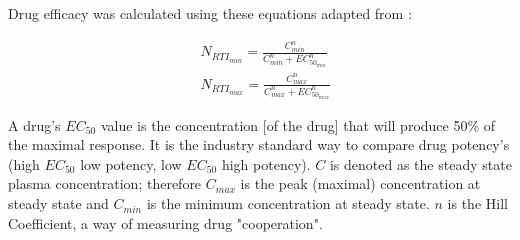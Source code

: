 \documentclass[letterpaper, 11 pt, conference]{ieeeconf}
\begin{document}
Drug efficacy was calculated using these equations adapted from \cite{drugEfficacy}:

\begin{equation}
    \begin{split}
        & N_{RTI_{min}} = \frac{C_{min}^n}{C_{min}^n + EC_{50_{min}}^n} \\
        & N_{RTI_{max}} = \frac{C_{max}^n}{C_{max}^n + EC_{50_{max}}^n}
    \end{split}
\end{equation}

A drug's $EC_{50}$ value is the concentration [of the drug] that will produce 50\% of the maximal response. It is the industry standard way to compare drug potency's (high $EC_{50}$ low potency, low $EC_{50}$ high potency). $C$ is denoted as the steady state plasma concentration; therefore $C_{max}$ is the peak (maximal) concentration at steady state and $C_{min}$ is the minimum concentration at steady state. $n$ is the Hill Coefficient, a way of measuring drug "cooperation". \\
\end{document}
